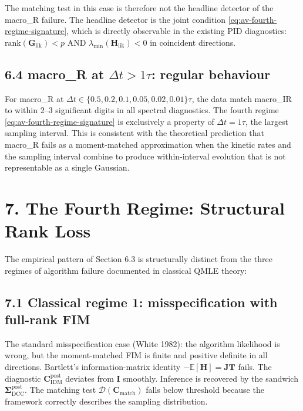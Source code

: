 \documentclass[11pt]{article}
\begin{document}
The matching test in this case is therefore not the headline detector
of the macro\_R failure. The headline detector is the joint condition
\eqref{eq:av-fourth-regime-signature}, which is directly observable in
the existing PID diagnostics: $\mathrm{rank}(\mathbf G_{\mathrm{lik}}) < p$
AND $\lambda_{\min}(\mathbf H_{\mathrm{lik}}) < 0$ in coincident
directions.

\subsection*{6.4 macro\_R at $\Delta t > 1\tau$: regular behaviour}

For macro\_R at $\Delta t \in \{0.5, 0.2, 0.1, 0.05, 0.02, 0.01\}\tau$,
the data match macro\_IR to within 2--3 significant digits in all
spectral diagnostics. The fourth regime
\eqref{eq:av-fourth-regime-signature} is exclusively a property of
$\Delta t = 1\tau$, the largest sampling interval. This is consistent
with the theoretical prediction that macro\_R fails as a
moment-matched approximation when the kinetic rates and the sampling
interval combine to produce within-interval evolution that is not
representable as a single Gaussian.

\section*{7. The Fourth Regime: Structural Rank Loss}
\label{sec:av-fourth-regime}

The empirical pattern of Section 6.3 is structurally distinct from
the three regimes of algorithm failure documented in classical
QMLE theory:

\subsection*{7.1 Classical regime 1: misspecification with full-rank FIM}

The standard misspecification case (White 1982): the algorithm
likelihood is wrong, but the moment-matched FIM is finite and
positive definite in all directions. Bartlett's information-matrix
identity $-\mathbb E[\mathbf H] = \mathbf{JT}$ fails. The diagnostic
$\mathbf C_{\mathrm{IDM}}^{\mathrm{post}}$ deviates from $\mathbf I$ smoothly.
Inference is recovered by the sandwich
$\boldsymbol\Sigma_{\mathrm{DCC}}^{\mathrm{post}}$. The
matching test $\mathcal D(\mathbf C_{\mathrm{match}})$ falls below threshold
because the framework correctly describes the sampling distribution.
\end{document}
